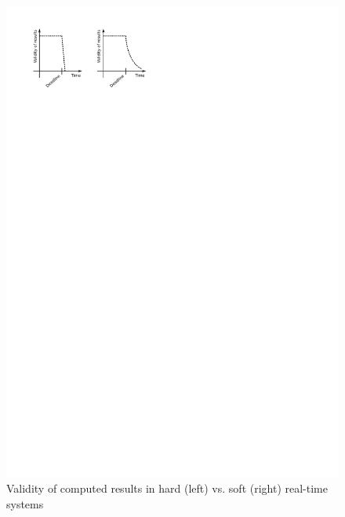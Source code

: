 \begin{figure}
\centering
\includegraphics{figs/hard_vs_soft}
\caption{Validity of computed results in hard (left) vs. soft (right)
  real-time systems}
\label{fig:hard_vs_soft}
\end{figure}

